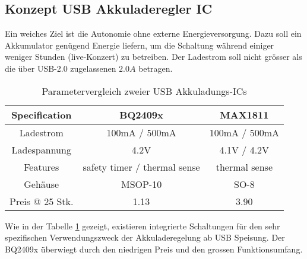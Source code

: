 \subsection{Konzept USB Akkuladeregler IC}
\label{subsec:Konzept_Charger}

Ein weiches Ziel ist die Autonomie ohne externe Energieversorgung. 
Dazu soll ein Akkumulator genügend Energie liefern, um die Schaltung während einiger weniger Stunden (live-Konzert) zu betreiben. 
Der Ladestrom soll nicht grösser als die über USB-2.0 zugelassenen $2.0\si{A}$ betragen.

\begin{table}[H]
	\centering
	\begin{tabular}{|c|c|c|}
		\hline
		\textbf{Specification} & \textbf{BQ2409x}             & \textbf{MAX1811} \\ \hline
		Ladestrom              & 100mA / 500mA                & 100mA / 500mA    \\ \hline
		Ladespannung           & 4.2V                         & 4.1V / 4.2V      \\ \hline
		Features               & safety timer / thermal sense & thermal sense    \\ \hline
		Gehäuse                & MSOP-10                      & SO-8             \\ \hline
		Preis @ 25 Stk.        & 1.13                         & 3.90             \\ \hline
	\end{tabular}
	\caption{Parametervergleich zweier USB Akkuladungs-ICs}
	\label{tab:ComparisonCharger}
\end{table}

Wie in der Tabelle \ref{tab:ComparisonCharger} gezeigt, existieren integrierte Schaltungen für den sehr spezifischen Verwendungszweck der Akkuladeregelung ab USB Speisung.
Der BQ2409x überwiegt durch den niedrigen Preis und den grossen Funktionsumfang.
